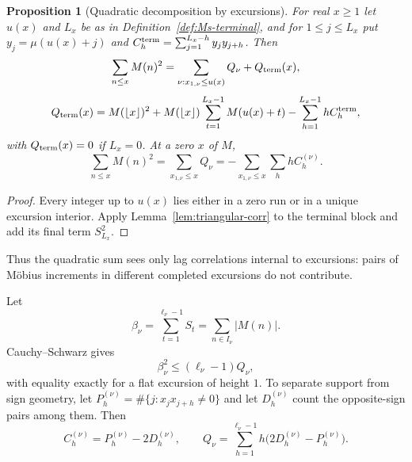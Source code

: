 \documentclass[11pt]{amsart}
\numberwithin{equation}{section}
\theoremstyle{plain}
\newtheorem{proposition}[theorem]{Proposition}
\theoremstyle{definition}
\theoremstyle{remark}
\begin{document}
\begin{proposition}[Quadratic decomposition by excursions]
\label{prop:quadratic-decomp}
For real $x\ge1$ let $u(x)$ and $L_x$ be as in
Definition~\ref{def:Ms-terminal}, and for $1\le j\le L_x$ put
$y_j=\mu(u(x)+j)$ and $C_h^{\rm term}=\sum_{j=1}^{L_x-h}y_jy_{j+h}$. Then
\begin{equation}
\label{eq:quadratic-decomp-general}
\sum_{n\le x}M(n)^2
=\sum_{\nu:x_{1,\nu}\le u(x)}Q_\nu+Q_{\rm term}(x),
\end{equation}
\begin{equation}
\label{eq:terminal-Q-exact}
Q_{\rm term}(x)=M(\lfloor x\rfloor)^2
+M(\lfloor x\rfloor)\sum_{t=1}^{L_x-1}M(u(x)+t)
-\sum_{h=1}^{L_x-1}hC_h^{\rm term},
\end{equation}
with $Q_{\rm term}(x)=0$ if $L_x=0$. At a zero $x$ of $M$,
\begin{equation}
\label{eq:quadratic-decomp-zero}
\sum_{n\le x}M(n)^2
=\sum_{x_{1,\nu}\le x}Q_\nu
=-\sum_{x_{1,\nu}\le x}\sum_hhC_h^{(\nu)}.
\end{equation}
\end{proposition}

\begin{proof}
Every integer up to $u(x)$ lies either in a zero run or in a unique excursion
interior. Apply Lemma~\ref{lem:triangular-corr} to the terminal block and
add its final term $S_{L_x}^2$.
\end{proof}

Thus the quadratic sum sees only lag correlations internal to excursions:
pairs of M\"obius increments in different completed excursions do not
contribute.

Let
\begin{equation}
\label{eq:beta_def}
\beta_\nu=\sum_{t=1}^{\ell_\nu-1}S_t=\sum_{n\in I_\nu}|M(n)|.
\end{equation}
Cauchy--Schwarz gives
\begin{equation}
\label{eq:beta-Q}
\beta_\nu^2\le(\ell_\nu-1)Q_\nu,
\end{equation}
with equality exactly for a flat excursion of height $1$. To separate
support from sign geometry, let $P_h^{(\nu)}=\#\{j:x_jx_{j+h}\ne0\}$ and let
$D_h^{(\nu)}$ count the opposite-sign pairs among them. Then
\begin{equation}
\label{eq:C-P-D}
C_h^{(\nu)}=P_h^{(\nu)}-2D_h^{(\nu)},\qquad
Q_\nu=\sum_{h=1}^{\ell_\nu-1}h\bigl(2D_h^{(\nu)}-P_h^{(\nu)}\bigr).
\end{equation}
\end{document}
